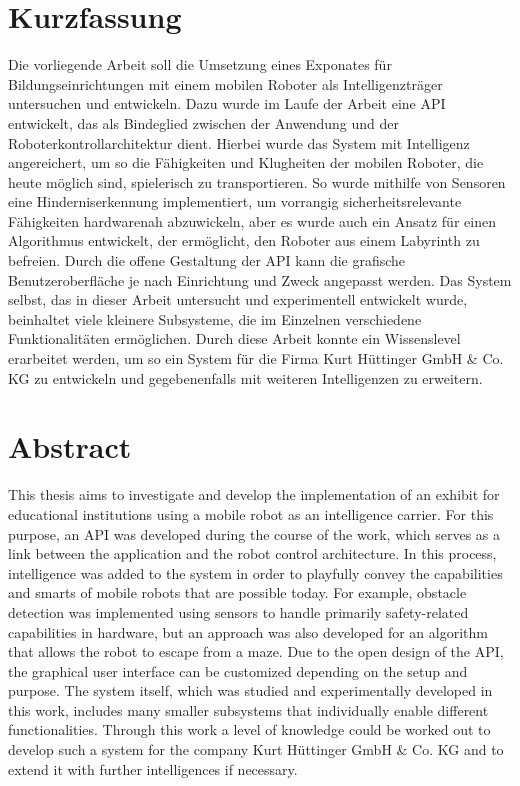 \section*{Kurzfassung}
Die vorliegende Arbeit soll die Umsetzung eines Exponates für Bildungseinrichtungen mit einem mobilen Roboter als Intelligenzträger untersuchen und entwickeln. Dazu wurde im Laufe der Arbeit eine API entwickelt, das als Bindeglied zwischen der Anwendung und der Roboterkontrollarchitektur dient. Hierbei wurde das System mit Intelligenz angereichert, um so die Fähigkeiten und Klugheiten der mobilen Roboter, die heute möglich sind, spielerisch zu transportieren. So wurde mithilfe von Sensoren eine Hinderniserkennung implementiert, um vorrangig sicherheitsrelevante Fähigkeiten hardwarenah abzuwickeln, aber es wurde auch ein Ansatz für einen Algorithmus entwickelt, der ermöglicht, den Roboter aus einem Labyrinth zu befreien. Durch die offene Gestaltung der API kann die grafische Benutzeroberfläche je nach Einrichtung und Zweck angepasst werden. Das System selbst, das in dieser Arbeit untersucht und experimentell entwickelt wurde, beinhaltet viele kleinere Subsysteme, die im Einzelnen verschiedene Funktionalitäten ermöglichen. Durch diese Arbeit konnte ein Wissenslevel erarbeitet werden, um so ein System für die Firma Kurt Hüttinger GmbH \& Co. KG zu entwickeln und gegebenenfalls mit weiteren Intelligenzen zu erweitern. 
\section*{Abstract}
This thesis aims to investigate and develop the implementation of an exhibit for educational institutions using a mobile robot as an intelligence carrier. For this purpose, an API was developed during the course of the work, which serves as a link between the application and the robot control architecture. In this process, intelligence was added to the system in order to playfully convey the capabilities and smarts of mobile robots that are possible today. For example, obstacle detection was implemented using sensors to handle primarily safety-related capabilities in hardware, but an approach was also developed for an algorithm that allows the robot to escape from a maze. Due to the open design of the API, the graphical user interface can be customized depending on the setup and purpose. The system itself, which was studied and experimentally developed in this work, includes many smaller subsystems that individually enable different functionalities. Through this work a level of knowledge could be worked out to develop such a system for the company Kurt Hüttinger GmbH \& Co. KG and to extend it with further intelligences if necessary.